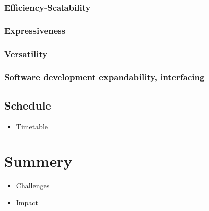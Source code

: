 \documentclass[a4paper,11pt]{article}
\begin{document}
\subsubsection{Efficiency-Scalability}
\subsubsection{Expressiveness}
\subsubsection{Versatility}
\subsubsection{Software development expandability, interfacing}
\subsection{Schedule}
\begin{itemize}
\item Timetable
\end{itemize}

\section{Summery}
\label{sec:summery}
\begin{itemize}
\item Challenges
\item Impact
\end{itemize}




\end{document}
